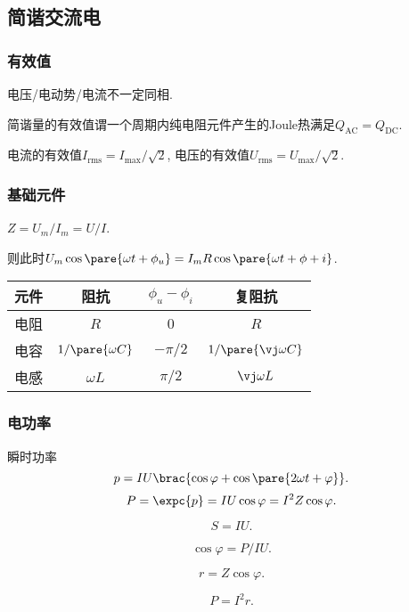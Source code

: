 \documentclass[hidelinks]{ctexart}
\begin{document}
\subsection{简谐交流电} %
\label{ssub:简谐交流电}

\subsubsection{有效值} %
\label{ssub:有效值}

电压/电动势/电流不一定同相.
\begin{definition}[有效值]
    简谐量的有效值谓一个周期内纯电阻元件产生的Joule热满足$Q_{\mathrm{AC}}=Q_{\mathrm{DC}}$.
\end{definition}
电流的有效值$I_{\mathrm{rms}} = I_{\mathrm{max}}/\sqrt{2}$, 电压的有效值$U_{\mathrm{rms}} = U_{\mathrm{max}}/\sqrt{2}$.


\subsubsection{基础元件} %
\label{ssub:基础元件}

\begin{definition}[阻抗]
    $Z = U_m/I_m = U/I$.
\end{definition}
则此时$U_m \cos\pare{\omega t + \phi_u} = I_m R\cos\pare{\omega t + \phi+i}$.

\begin{tabular}{|c|c|c|c|}
    \hline
    元件 & 阻抗 & $\phi_u - \phi_i$ & 复阻抗\\
    \hline
    电阻 & $R$ & $0$ & $R$ \\
    \hline
    电容 & $1/\pare{\omega C}$ & $-\pi/2$ & $1/\pare{\vj \omega C}$ \\
    \hline
    电感 & $\omega L$ & $\pi/2$ & $\vj \omega L$ \\
    \hline
\end{tabular}


\subsubsection{电功率} %
\label{ssub:电功率}

瞬时功率
\[ p = IU \brac{\cos\varphi + \cos\pare{2\omega t + \varphi}}. \]
\[ P = \expc{p} = IU\cos\varphi = I^2Z\cos\varphi. \]

\begin{definition}[视在功率]
    \[ S = IU. \]
\end{definition}
\begin{definition}[功率因素]
    \[ \cos\varphi = P/IU. \]
\end{definition}
\begin{definition}[有功电阻]
    \[ r=Z\cos\varphi. \]
\end{definition}
\begin{finale}
    \[ P = I^2 r. \]
\end{finale}
\end{document}
